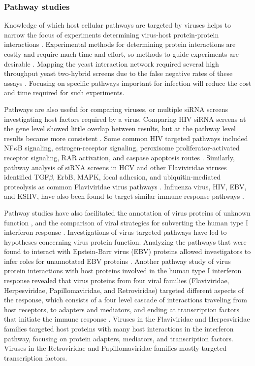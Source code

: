 \subsubsection{Pathway studies}

Knowledge of which host cellular pathways are targeted by viruses
helps to narrow the focus of experiments determining virus-host
protein-protein interactions \cite{lee2004probabilistic}. Experimental
methods for determining protein interactions are costly and require
much time and effort, so methods to guide experiments are desirable
\cite{skrabanek2008computational}. Mapping the yeast interaction
network required several high throughput yeast two-hybrid screens due
to the false negative rates of these assays
\cite{collins2007toward,huang2009precision}. Focusing on specific
pathways important for infection will reduce the cost and time
required for such experiments.

Pathways are also useful for comparing viruses, or multiple siRNA
screens investigating host factors required by a virus. Comparing HIV
siRNA screens at the gene level showed little overlap between results,
but at the pathway level results became more consistent
\cite{yeung09}. Some common HIV targeted pathways included NF$\kappa$B
signaling, estrogen-receptor signaling, peroxisome
proliferator-activated receptor signaling, RAR activation, and caspase
apoptosis routes \cite{yeung09}. Similarly, pathway analysis of siRNA
screens in HCV and other Flaviviridae viruses identified TGF$\beta$,
ErbB, MAPK, focal adhesion, and ubiquitin-mediated proteolysis as
common Flaviviridae virus pathways \cite{Li09}. Influenza virus, HIV,
EBV, and KSHV, have also been found to target similar immune response
pathways \cite{shapira2009physical,brander2000modulation}.

Pathway studies have also facilitated the annotation of virus proteins
of unknown function \cite{calderwood07}, and the comparison of viral
strategies for subverting the human type I interferon response
\cite{navratil-system}. Investigations of virus targeted pathways have
led to hypotheses concerning virus protein function. Analyzing the
pathways that were found to interact with Epstein-Barr virus (EBV)
proteins allowed investigators to infer roles for unannotated EBV
proteins \cite{calderwood07}. Another pathway study of virus protein
interactions with host proteins involved in the human type I
interferon response revealed that virus proteins from four viral
families (Flaviviridae, Herpesviridae, Papillomaviridae, and
Retroviridae) targeted different aspects of the response, which
consists of a four level cascade of interactions traveling from host
receptors, to adapters and mediators, and ending at transcription
factors that initiate the immune response
\cite{navratil-system}. Viruses in the Flaviviridae and Herpesviridae
families targeted host proteins with many host interactions in the
interferon pathway, focusing on protein adapters, mediators, and
transcription factors. Viruses in the Retroviridae and
Papillomaviridae families mostly targeted transcription factors.

